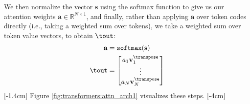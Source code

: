 We then normalize the vector $\mathbf{s}$ using the softmax function to give us our attention weights $\mathbf{a} \in \mathbb{R}^{N \times 1}$, and finally, rather than applying $\mathbf{a}$ over token codes directly (i.e., taking a weighted sum over tokens), we take a weighted sum over token value vectors, to obtain $\tout$: %
\begin{align}
    \mathbf{a} & = \texttt{softmax}(\mathbf{s}) \\
    \tout      & = \begin{bmatrix}
                       a_1\mathbf{v}_1^\transpose \\
                       \vdots                     \\
                       a_N\mathbf{v}_N^\transpose \\
                   \end{bmatrix}
\end{align}
[-1.4cm]
Figure \ref{fig:transformers:attn_arch1} visualizes these steps.
[-4cm]

